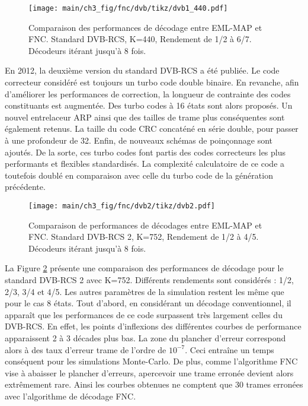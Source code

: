 \begin{figure}[!htb]
	\centering
	\texttt{[image: main/ch3\_fig/fnc/dvb/tikz/dvb1\_440.pdf]}
	\caption{Comparaison des performances de décodage entre EML-MAP et FNC. Standard DVB-RCS, K=440, Rendement de 1/2 à 
	6/7. Décodeurs itérant jusqu'à 8 fois. \label{fig:fnc_dvb1_440}}
\end{figure}
En 2012, la deuxième version du standard DVB-RCS a été publiée. Le code correcteur considéré est toujours un turbo code double
binaire. En revanche, afin d'améliorer les performances de correction, la longueur de contrainte des codes constituants
est augmentée. Des turbo codes à 16 états sont alors proposés. Un nouvel entrelaceur ARP ainsi que des tailles de trame
plus conséquentes sont également retenus. La taille du code CRC concaténé en série double, pour passer à une profondeur de 32. 
Enfin, de nouveaux schémas de poinçonnage sont ajoutés. De la sorte, ces turbo codes font 
partis des codes correcteurs les plus performants et flexibles standardisés. La complexité calculatoire de ce code a
toutefois doublé en comparaison avec celle du turbo code de la génération précédente. 

\begin{figure}[!htb]
	\centering
	\texttt{[image: main/ch3\_fig/fnc/dvb2/tikz/dvb2.pdf]}
	\caption{Comparaison de performances de décodages entre EML-MAP et FNC. Standard DVB-RCS 2, K=752, Rendement de 1/2 à 
	4/5. Décodeurs itérant jusqu'à 8 fois. \label{fig:fnc_dvb2_752}}
\end{figure}

La Figure \ref{fig:fnc_dvb2_752} présente une comparaison des performances de décodage pour le standard DVB-RCS 2 avec
K=752. Différents rendements sont considérés : 1/2, 2/3, 3/4 et 4/5. Les autres paramètres de la simulation restent les
même que pour le cas 8 états.
Tout d'abord, en considérant un décodage conventionnel, il apparaît que les performances de ce code surpassent très largement 
celles du DVB-RCS. En effet, les points d'inflexions des différentes courbes de performance apparaissent 2 à 3 décades
plus bas. La zone du plancher d'erreur correspond alors à des taux d'erreur trame de l'ordre de $10^{-7}$. Ceci entraîne
un temps conséquent pour les simulations Monte-Carlo. De plus, comme l'algorithme FNC vise à abaisser le plancher 
d'erreurs, apercevoir une trame erronée devient alors extrêmement rare. Ainsi les courbes obtenues ne comptent que 30 
trames erronées avec l'algorithme de décodage FNC.

